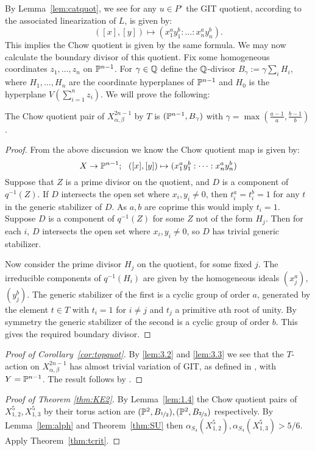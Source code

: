 %
%
By Lemma~\ref{lem:catquot}, we see for any \(u \in P^\circ\) the GIT quotient, according to the associated linearization of \(L\), is given by:
\[
([x],[y]) \mapsto (x_1^a y_1^b: \dots : x_n^a y_n^b).
\]
This implies the Chow quotient is given by the same formula. We may now calculate the boundary divisor of this quotient. Fix some homogeneous coordinates \(z_1,\dots,z_n\) on \(\mathbb{P}^{n-1}\). For \(\gamma \in \mathbb{Q}\) define the \(\mathbb{Q}\)-divisor \(B_\gamma := \gamma \sum_i H_i\), where \(H_1,\dots,H_n\) are the coordinate hyperplanes of \(\mathbb{P}^{n-1}\) and \(H_0\) is the hyperplane \(V( \sum_{i=1}^n z_i)\). We will prove the following:
\begin{lemma}\label{lem:1.4}
The Chow quotient pair of \(X_{\alpha,\beta}^{2n-1}\) by \(T\) is \((\mathbb{P}^{n-1},B_\gamma)\) with \(\gamma = \max \left(\frac{a-1}{a}, \frac{b - 1}{b} \right)\).
\end{lemma}
\begin{proof}
From the above discussion we know the Chow quotient map is given by:
\[
X \to \PP^{n-1}; \ \ ([x],[y]) \mapsto (x_1^a y_1^b: \dots : x_n^a y_n^b )
\]
Suppose that \(Z\) is a prime divisor on the quotient, and \(D\) is a component of \(q^{-1}(Z)\). If \(D\) intersects the open set where \(x_i,y_i \neq 0\), then \(t_i^a = t_i^b = 1\) for any \(t\) in the generic stabilizer of \(D\). As \(a,b\) are coprime this would imply \(t_i = 1\). Suppose \(D\) is a component of \(q^{-1}(Z)\) for some \(Z\) not of the form \(H_j\). Then for each \(i\), \(D\) intersects the open set where \(x_i,y_i \neq 0\), so \(D\) has trivial generic stabilizer.

Now consider the prime divisor \(H_j\) on the quotient, for some fixed \(j\). The irreducible components of \(q^{-1}(H_i)\) are given by the homogeneous ideals \((x_j^a)\), \((y_j^b)\). The generic stabilizer of the first is a cyclic group of order \(a\), generated by the element \(t \in T\) with \(t_i = 1\) for \(i \neq j\) and \(t_j\) a primitive \(a\)th root of unity. By symmetry the generic stabilizer of the second is a cyclic group of order \(b\). This gives the required boundary divisor.
\end{proof}
\begin{proof}[Proof of Corollary~\ref{cor:topquot}]
By \ref{lem:3.2} and \ref{lem:3.3} we see that the \(T\)-action on \(X^{2n-1}_{\alpha,\beta}\) has almost trivial variation of GIT, as defined in \cite[Definition 2.7]{suess18-2}, with \(Y = \mathbb{P}^{n-1}\). The result follows by \cite[Proposition 2.9]{suess18-2}.
\end{proof}
\begin{proof}[Proof of Theorem \ref{thm:KE2}]
By Lemma~\ref{lem:1.4} the Chow quotient pairs of \(X_{1,2}^{5},X_{1,3}^{5}\) by their torus action are \((\mathbb{P}^2,B_{\nicefrac{1}{2}}), (\mathbb{P}^2,B_{\nicefrac{2}{3}})\) respectively. By Lemma~\ref{lem:alph} and Theorem~\ref{thm:SU} then \(\alpha_{S_4}(X_{1,2}^{5}),\alpha_{S_4}(X_{1,3}^{5}) > 5/6\). Apply Theorem~\ref{thm:tcrit}.
\end{proof}
